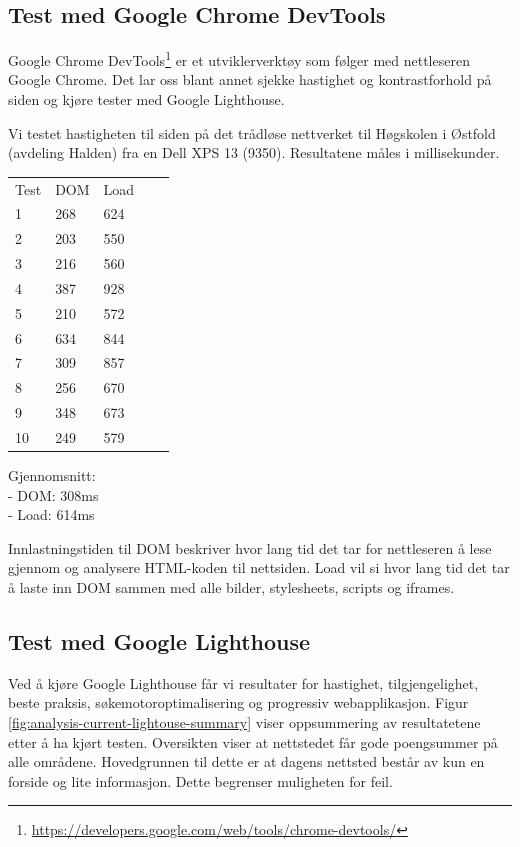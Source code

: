 \subsection{Test med Google Chrome DevTools}
Google Chrome DevTools\footnote{\url{https://developers.google.com/web/tools/chrome-devtools/}} er et utviklerverktøy som følger med nettleseren Google Chrome. Det lar oss blant annet sjekke hastighet og kontrastforhold på siden og kjøre tester med Google Lighthouse.

Vi testet hastigheten til siden på det trådløse nettverket til Høgskolen i Østfold (avdeling Halden) fra en Dell XPS 13 (9350).
Resultatene måles i millisekunder.

\begin{table}[H]
\begin{tabular}{lllll}
Test & DOM & Load &  &  \\
1 & 268 & 624 &  &  \\
2 & 203 & 550 &  &  \\
3 & 216 & 560 &  &  \\
4 & 387 & 928 &  &  \\
5 & 210 & 572 &  &  \\
6 & 634 & 844 &  &  \\
7 & 309 & 857 &  &  \\
8 & 256 & 670 &  &  \\
9 & 348 & 673 &  &  \\
10 & 249 & 579 &  &  \\
\end{tabular}
\end{table}

Gjennomsnitt:\\
- DOM: 308ms\\
- Load: 614ms

Innlastningstiden til DOM beskriver hvor lang tid det tar for nettleseren å lese gjennom og analysere HTML-koden til nettsiden. Load vil si hvor lang tid det tar å laste inn DOM sammen med alle bilder, stylesheets, scripts og iframes.

\subsection{Test med Google Lighthouse}
\label{sec:analysis-current-lighthouse}

Ved å kjøre Google Lighthouse får vi resultater for hastighet, tilgjengelighet, beste praksis, søkemotoroptimalisering og progressiv webapplikasjon. Figur \ref{fig:analysis-current-lightouse-summary} viser oppsummering av resultatetene etter å ha kjørt testen. Oversikten viser at nettstedet får gode poengsummer på alle områdene. Hovedgrunnen til dette er at dagens nettsted består av kun en forside og lite informasjon. Dette begrenser muligheten for feil.

